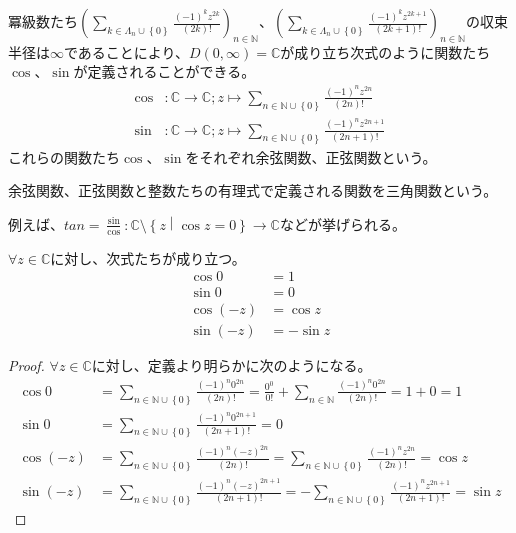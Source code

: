 \documentclass[dvipdfmx]{jsarticle}
\begin{document}
\begin{dfn}
冪級数たち$\left( \sum_{k \in \varLambda_{n} \cup \left\{ 0 \right\}} \frac{( - 1)^{k}z^{2k}}{(2k)!} \right)_{n \in \mathbb{N}}$、$\left( \sum_{k \in \varLambda_{n} \cup \left\{ 0 \right\}} \frac{( - 1)^{k}z^{2k + 1}}{(2k + 1)!} \right)_{n \in \mathbb{N}}$の収束半径は$\infty$であることにより、$D(0,\infty) = \mathbb{C}$が成り立ち次式のように関数たち$\cos$、$\sin$が定義されることができる。
\begin{align*}
\cos &:\mathbb{C} \rightarrow \mathbb{C};z \mapsto \sum_{n \in \mathbb{N} \cup \left\{ 0 \right\}} \frac{( - 1)^{n}z^{2n}}{(2n)!}\\
\sin &:\mathbb{C} \rightarrow \mathbb{C};z \mapsto \sum_{n \in \mathbb{N} \cup \left\{ 0 \right\}} \frac{( - 1)^{n}z^{2n + 1}}{(2n + 1)!}
\end{align*}
これらの関数たち$\cos$、$\sin$をそれぞれ余弦関数、正弦関数という。
\end{dfn}
\begin{dfn}
余弦関数、正弦関数と整数たちの有理式で定義される関数を三角関数という。
\end{dfn}\par
例えば、$tan = \frac{\sin}{\cos}:\mathbb{C} \setminus \left\{ z \middle| \cos z = 0 \right\} \rightarrow \mathbb{C}$などが挙げられる。
\begin{thm}\label{4.3.1.11} $\forall z \in \mathbb{C}$に対し、次式たちが成り立つ。
\begin{align*}
  \cos 0 &= 1\\
  \sin 0 &= 0\\
  \cos( - z) &= \cos z\\
  \sin( - z) &= - \sin z
\end{align*}
\end{thm}
\begin{proof}
$\forall z \in \mathbb{C}$に対し、定義より明らかに次のようになる。
\begin{align*}
\cos 0 &= \sum_{n \in \mathbb{N} \cup \left\{ 0 \right\}} \frac{( - 1)^{n}0^{2n}}{(2n)!} = \frac{0^{0}}{0!} + \sum_{n \in \mathbb{N}} \frac{( - 1)^{n}0^{2n}}{(2n)!} = 1 + 0 = 1\\
\sin 0 &= \sum_{n \in \mathbb{N} \cup \left\{ 0 \right\}} \frac{( - 1)^{n}0^{2n + 1}}{(2n + 1)!} = 0\\
\cos( - z) &= \sum_{n \in \mathbb{N} \cup \left\{ 0 \right\}} \frac{( - 1)^{n}( - z)^{2n}}{(2n)!} = \sum_{n \in \mathbb{N} \cup \left\{ 0 \right\}} \frac{( - 1)^{n}z^{2n}}{(2n)!} = \cos z\\
\sin( - z) &= \sum_{n \in \mathbb{N} \cup \left\{ 0 \right\}} \frac{( - 1)^{n}( - z)^{2n + 1}}{(2n + 1)!} = - \sum_{n \in \mathbb{N} \cup \left\{ 0 \right\}} \frac{( - 1)^{n}z^{2n + 1}}{(2n + 1)!} = \sin z
\end{align*}
\end{proof}
\end{document}
